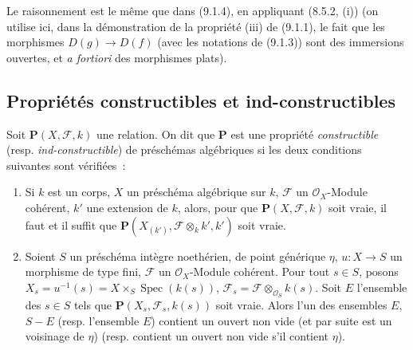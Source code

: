 Le raisonnement est le même que dans (9.1.4), en appliquant (8.5.2, (i))
(on utilise ici, dans la démonstration de la propriété (iii) de (9.1.1), le
fait que les morphismes $D(g)\to D(f)$ (avec les notations de (9.1.3)) sont
des immersions ouvertes, et \emph{a fortiori} des morphismes plats).

\subsection{Propriétés constructibles et ind-constructibles}
\label{subsection:IV.9.2-fr}

\begin{definition}[9.2.1]
\label{IV.9.2.1-fr}
Soit $\mathbf P(X,\mathcal F,k)$ une relation. On dit que $\mathbf P$ est une
propriété \emph{constructible} (resp. \emph{ind-constructible}) de préschémas
algébriques si les deux conditions suivantes sont vérifiées~:
\begin{enumerate}[label=(\roman*)]
  \item Si $k$ est un corps, $X$ un préschéma algébrique sur $k$,
  $\mathcal F$ un $\mathcal O_X$-Module cohérent, $k'$ une extension de $k$,
  alors, pour que $\mathbf P(X,\mathcal F,k)$ soit vraie, il faut et il suffit
  que $\mathbf P(X_{(k')},\mathcal F\otimes_k k',k')$ soit vraie.
  \item Soient $S$ un préschéma intègre noethérien, de point générique $\eta$,
  $u:X\to S$ un morphisme de type fini, $\mathcal F$ un $\mathcal O_X$-Module
  cohérent. Pour tout $s\in S$, posons
  $X_s=u^{-1}(s)=X\times_S\operatorname{Spec}(k(s))$,
  $\mathcal F_s=\mathcal F\otimes_{\mathcal O_S}k(s)$. Soit $E$ l'ensemble
  des $s\in S$ tels que $\mathbf P(X_s,\mathcal F_s,k(s))$ soit vraie.
  Alors l'un des ensembles $E$, $S-E$ (resp. l'ensemble $E$) contient un
  ouvert non vide (et par suite est un voisinage de $\eta$) (resp. contient
  un ouvert non vide s'il contient $\eta$).
\end{enumerate}
\end{definition}

